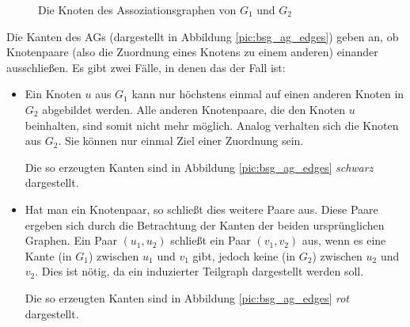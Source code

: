 
\begin{figure}[htb]
\centering
\vspace{0.5cm}
\caption{Die Knoten des Assoziationsgraphen von $G_1$ und $G_2$}
\label{pic:bsg_ag_nodes}
\end{figure}

Die Kanten des AGs (dargestellt in Abbildung \ref{pic:bsg_ag_edges}) geben an, 
ob Knotenpaare (also die Zuordnung eines Knotens zu einem anderen) einander 
ausschließen. Es gibt zwei Fälle, in denen das der Fall ist: 
\begin{itemize}
  \item Ein Knoten $u$ aus $G_1$ kann nur höchstens einmal auf einen anderen 
	      Knoten in $G_2$ abgebildet werden. Alle anderen Knotenpaare, die den 
        Knoten $u$ beinhalten, sind somit nicht mehr möglich. Analog verhalten 
        sich die Knoten aus $G_2$. Sie können nur einmal Ziel einer Zuordnung 
        sein.
        
        Die so erzeugten Kanten sind in Abbildung \ref{pic:bsg_ag_edges} 
        \emph{schwarz} dargestellt.
        
  \item Hat man ein Knotenpaar, so schließt dies weitere Paare 
        aus. Diese Paare ergeben sich durch die Betrachtung der Kanten der beiden 
        ursprünglichen Graphen. Ein Paar $(u_1, u_2)$ schließt ein Paar 
        $(v_1, v_2)$ aus, wenn es eine Kante (in $G_1$) zwischen $u_1$ 
        und $v_1$ gibt, jedoch keine (in $G_2$) zwischen $u_2$ und $v_2$. 
        Dies ist nötig, da ein induzierter Teilgraph dargestellt werden soll.
        
        Die so erzeugten Kanten sind in Abbildung \ref{pic:bsg_ag_edges} 
        \emph{rot} dargestellt.

\end{itemize}

